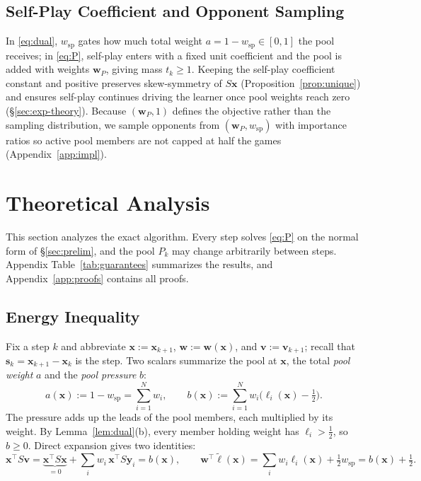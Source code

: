 \documentclass{article} %
\theoremstyle{plain}
\theoremstyle{remark}
\newcommand{\bx}{{\bm{x}}}
\newcommand{\by}{{\bm{y}}}
\newcommand{\bv}{{\bm{v}}}
\newcommand{\bw}{{\bm{w}}}
\newcommand{\bell}{{\bm{\ell}}}
\newcommand{\aug}{\tilde{\bell}}
\newcommand{\dx}{{\bm{s}}}
\newcommand{\wsp}{w_{\mathrm{sp}}}
\begin{document}
\subsection{Self-Play Coefficient and Opponent Sampling}
\label{sec:share}

In \eqref{eq:dual}, $\wsp$ gates how much total weight $a=1-\wsp\in[0,1]$ the pool receives; in \eqref{eq:P}, self-play enters with a fixed unit coefficient and the pool is added with weights $\bw_P$, giving mass $t_k\ge1$. Keeping the self-play coefficient constant and positive preserves skew-symmetry of $S\bx$ (Proposition~\ref{prop:unique}) and ensures self-play continues driving the learner once pool weights reach zero (\S\ref{sec:exp-theory}). Because $(\bw_P,1)$ defines the objective rather than the sampling distribution, we sample opponents from $(\bw_P,\wsp)$ with importance ratios so active pool members are not capped at half the games (Appendix~\ref{app:impl}).


\section{Theoretical Analysis}
\label{sec:theory}

This section analyzes the exact algorithm. Every step solves \eqref{eq:P} on the normal form of \S\ref{sec:prelim}, and the pool $P_k$ may change arbitrarily between steps. Appendix Table~\ref{tab:guarantees} summarizes the results, and Appendix~\ref{app:proofs} contains all proofs.


\subsection{Energy Inequality}
\label{sec:energy}

Fix a step $k$ and abbreviate $\bx:=\bx_{k+1}$, $\bw:=\bw(\bx)$, and $\bv:=\bv_{k+1}$; recall that $\dx_k=\bx_{k+1}-\bx_k$ is the step. Two scalars summarize the pool at $\bx$, the total \emph{pool weight} $a$ and the \emph{pool pressure} $b$:
\[
a(\bx):=1-\wsp=\sum_{i=1}^Nw_i,\qquad
b(\bx):=\sum_{i=1}^Nw_i\big(\ell_i(\bx)-\tfrac12\big).
\]
The pressure adds up the leads of the pool members, each multiplied by its weight. By Lemma~\ref{lem:dual}(b), every member holding weight has $\ell_i>\tfrac12$, so $b\ge0$. Direct expansion gives two identities:
\begin{equation}
\bx^\top S\bv=\underbrace{\bx^\top S\bx}_{=0}+\textstyle\sum_iw_i\,\bx^\top S\by_i=b(\bx),\qquad
\bw^\top\aug(\bx)=\textstyle\sum_iw_i\ell_i(\bx)+\tfrac12\wsp=b(\bx)+\tfrac12 .
\label{eq:identities}
\end{equation}
\end{document}
